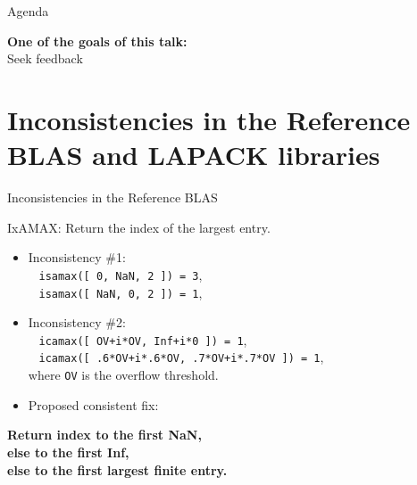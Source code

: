 \documentclass[11pt]{beamer}
\begin{document}
\begin{frame}{Agenda}

	\tableofcontents

	\begin{center}
		\textbf{One of the goals of this talk:}\\
	Seek feedback
\end{center}

\end{frame}

\section{Inconsistencies in the Reference BLAS and LAPACK libraries}

\begin{frame}{Inconsistencies in the Reference BLAS}

	IxAMAX: Return the index of the largest entry.
	\begin{itemize}
		\item Inconsistency \#1:\\
		~ \texttt{isamax([ 0, NaN, 2 ]) = 3},\\
		~ \texttt{isamax([ NaN, 0, 2 ]) = 1},
		\item Inconsistency \#2:\\
		~ \texttt{icamax([ OV+i*OV, Inf+i*0 ]) = 1},\\
		~ \texttt{icamax([ .6*OV+i*.6*OV, .7*OV+i*.7*OV ]) = 1},\\
		where \texttt{OV} is the overflow threshold.
		\item Proposed consistent fix: 
	\end{itemize}

	\begin{center}
		\textbf{Return index to the first NaN,\\ else to the first Inf,\\ else to the first largest finite entry.}
	\end{center}
	


\end{frame}
\end{document}
